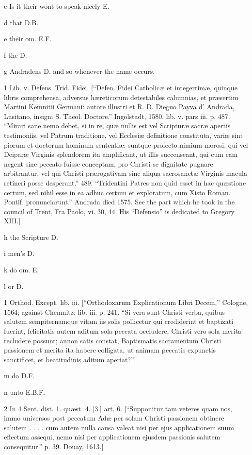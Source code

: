 c
Is it their wont to speak nicely E.

d
that D.B.

e
their om. E.F.

f
the D.

g
Andradens D. and so whenever the name occurs.

1
Lib. v. Defens. Trid. Fidei. [“Defen. Fidei Catholicæ et integerrimæ, quinque libris comprehensa, adversus hæreticorum detestabiles calumnias, et præsertim Martini Kemnitii Germani: autore illustri et R. D. Dieguo Payva d’ Andrada, Lusitano, insigni S. Theol. Doctore.” Ingolstadt, 1580. lib. v. pars iii. p. 487. “Mirari sane nemo debet, si in re, quæ nullis est vel Scripturæ sacræ apertis testimoniis, vel Patrum traditione, vel Ecclesiæ definitione constituta, variæ sint piorum et doctorum hominum sententiæ: suntque profecto nimium morosi, qui vel Deiparæ Virginis splendorem ita amplificant, ut illis succenseant, qui cum eam negent sine peccato fuisse conceptam, pro Christi se dignitate pugnare arbitrantur, vel qui Christi prærogativam sine aliqua sacrosanctæ Virginis macula retineri posse desperant.” 489. “Tridentini Patres non quid esset in hac quæstione certum, sed nihil esse in ea adhuc certum et exploratum, cum Xisto Roman. Pontif. pronunciarunt.” Andrada died 1575. See the part which he took in the council of Trent, Fra Paolo, vi. 30, 44. His “Defensio” is dedicated to Gregory XIII.]

h
the Scripture D.

i
men’s D.

k
do om. E.

l
or D.

1
Orthod. Except. lib. iii. [“Orthodoxarum Explicationum Libri Decem,” Cologne, 1564; against Chemnitz; lib. iii. p. 241. “Si vera sunt Christi verba, quibus salutem sempiternamque vitam iis solis pollicetur qui crediderint et baptizati fuerint, felicitatis autem aditum sola peccata occludere, Christi vero sola merita recludere possunt; annon satis constat, Baptismatis sacramentum Christi passionem et merita ita habere colligata, ut animam peccatis expunctis sanctificet, et beatitudinis aditum aperiat?”]

m
do D.F.

n
unto E.B.F.

2
In 4 Sent. dist. 1. quæst. 4. [3.] art. 6. [“Supponitur tam veteres quam nos, immo universos post peccatum Adæ per solam Christi passionem obtinere salutem . . . . cum autem nulla causa valeat nisi per ejus applicationem suum effectum assequi, nemo nisi per applicationem ejusdem passionis salutem consequitur.” p. 39. Douay, 1613.]

